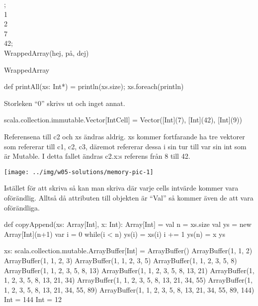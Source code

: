 

\ExerciseSolution{\ExeWeekFIVE}


\BasicTasks %

\Task %

;\\
 1\\
 2\\
 7\\
 42;\\
 WrappedArray(hej, på, dej)

\Subtask WrappedArray

\Subtask def printAll(xs: Int*) = {println(xs.size); xs.foreach(println)}  

\Subtask Storleken “0” skrivs ut och inget annat.



\Task %

\Subtask \begin{REPL}
scala.collection.immutable.Vector[IntCell] = 
    Vector([Int](7), [Int](42), [Int](9))
\end{REPL}
Referensena till c2 och xs ändras aldrig. 
xs kommer fortfarande ha tre vektorer som refererar till c1, c2, c3, däremot refererar dessa i sin tur till var sin int som är Mutable. 
I detta fallet ändras c2.x:s referens från 8 till 42.

\Subtask \texttt{[image: ../img/w05-solutions/memory-pic-1]}

\Subtask Istället för att skriva  så kan man skriva  där varje cells intvärde kommer vara oförändlig. 
Alltså då attributen till objekten är “Val” så kommer även de att vara oförändliga. 


\Task %

\Subtask \begin{Code}
def copyAppend(xs: Array[Int], x: Int): Array[Int] = {
  val n = xs.size
  val ys = new Array[Int](n+1)
  var i = 0
  while(i < n) {
    ys(i) = xs(i)
    i += 1	
  }
  ys(n) = x
  ys
}
\end{Code}

\Subtask \begin{REPL}
xs: scala.collection.mutable.ArrayBuffer[Int] = ArrayBuffer()
ArrayBuffer(1, 1, 2)
ArrayBuffer(1, 1, 2, 3)
ArrayBuffer(1, 1, 2, 3, 5)
ArrayBuffer(1, 1, 2, 3, 5, 8)
ArrayBuffer(1, 1, 2, 3, 5, 8, 13)
ArrayBuffer(1, 1, 2, 3, 5, 8, 13, 21)
ArrayBuffer(1, 1, 2, 3, 5, 8, 13, 21, 34)
ArrayBuffer(1, 1, 2, 3, 5, 8, 13, 21, 34, 55)
ArrayBuffer(1, 1, 2, 3, 5, 8, 13, 21, 34, 55, 89)
ArrayBuffer(1, 1, 2, 3, 5, 8, 13, 21, 34, 55, 89, 144)
Int = 144
Int = 12
\end{REPL}

